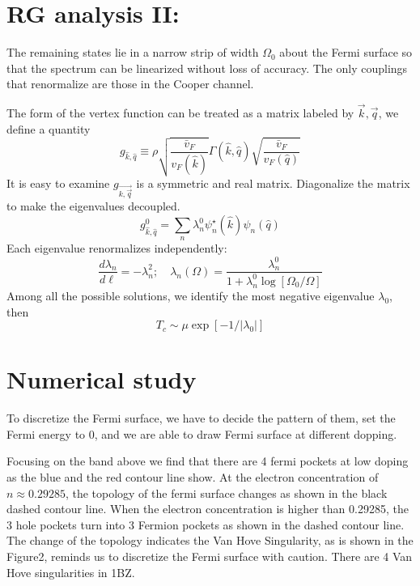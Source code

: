 \documentclass[12pt]{article}
\numberwithin{equation}{section}
\begin{document}
\section{RG analysis II:}
The remaining states lie in a narrow strip of width $\Omega_0$ about the Fermi surface so that the spectrum can be linearized without loss of accuracy.
The only couplings that renormalize are those in the Cooper channel.\par 
The form of the vertex function can be treated as a matrix labeled by $\vec{k},\vec{q}$, we define a quantity
\begin{equation}
	g_{\hat{k}, \hat{q}} \equiv \rho \sqrt{\frac{\bar{v}_{F}}{v_{F}(\hat{k})}} \Gamma(\hat{k}, \hat{q}) \sqrt{\frac{\bar{v}_{F}}{v_{F}(\hat{q})}}
	\end{equation}
It is easy to examine $g_{\vec{k,\vec{q}}}$ is a symmetric and real matrix. Diagonalize the matrix to make the eigenvalues decoupled. 
\begin{equation}
	g_{\hat{k}, \hat{q}}^{0}=\sum_{n} \lambda_{n}^{0} \psi_{n}^{\star}(\hat{k}) \psi_{n}(\hat{q})
	\end{equation}
Each eigenvalue renormalizes independently:
\begin{equation}
	\frac{d \lambda_{n}}{d \ell}=-\lambda_{n}^{2} ; \quad \lambda_{n}(\Omega)=\frac{\lambda_{n}^{0}}{1+\lambda_{n}^{0} \log \left[\Omega_{0} / \Omega\right]}
	\end{equation}
Among all the possible solutions, we identify the most negative eigenvalue $\lambda_0$, then
\begin{equation}
	T_c\sim \mu \exp[-1/|\lambda_0|]
\end{equation}
\section{Numerical study}
To discretize the Fermi surface, we have to decide the pattern of them, set the Fermi energy to 0, and we are able to draw Fermi surface at different dopping.\par 

Focusing on the band above we find that there are 4 fermi pockets at low doping as the blue and the red contour line show. At the electron concentration of  $n\approx 0.29285$, the topology of the fermi surface changes
as shown in the black dashed contour line. When the electron concentration is higher than 0.29285, the 3 hole pockets turn into 3 Fermion pockets as shown in the dashed contour line. The change of the topology indicates the Van Hove Singularity, as is shown in the Figure2, reminds us to discretize the 
Fermi surface with caution. There are 4 Van Hove singularities in 1BZ.\par 
\end{document}
